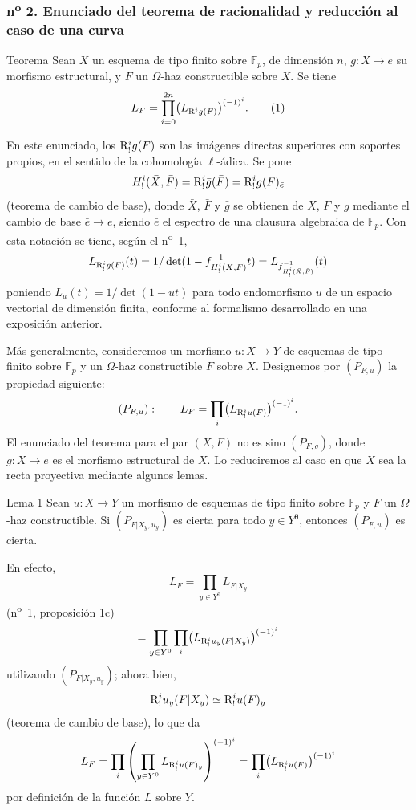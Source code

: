 \subsubsection*{n\textsuperscript{o} 2. Enunciado del teorema de racionalidad y reducción al caso de una curva}

\begin{statement}{Teorema}
Sean $X$ un esquema de tipo finito sobre $\mathbb F_p$, de dimensión $n$, $g:X\to e$ su morfismo estructural, y $F$ un $\Omega$-haz constructible sobre $X$. Se tiene
\[
L_F=\prod_{i=0}^{2n}\bigl(L_{\mathrm{R}^i_!g(F)}\bigr)^{(-1)^i}.
\tag{1}
\]
\end{statement}

En este enunciado, los $\mathrm{R}^i_!g(F)$ son las imágenes directas superiores con soportes propios, en el sentido de la cohomología $\ell$-ádica. Se pone
\[
H^i_!(\bar X,\bar F)=\mathrm{R}^i_!\bar g(\bar F)=\mathrm{R}^i_!g(F)_{\bar e}
\]
(teorema de cambio de base), donde $\bar X$, $\bar F$ y $\bar g$ se obtienen de $X$, $F$ y $g$ mediante el cambio de base $\bar e\to e$, siendo $\bar e$ el espectro de una clausura algebraica de $\mathbb F_p$. Con esta notación se tiene, según el n\textsuperscript{o}~1,
\[
L_{\mathrm{R}^i_!g(F)}(t)=1/\det(1-f^{-1}_{H^i_!(\bar X,\bar F)}t)
 =L_{f^{-1}_{H^i_!(\bar X,\bar F)}}(t)
\]
poniendo $L_u(t)=1/\det(1-ut)$ para todo endomorfismo $u$ de un espacio vectorial de dimensión finita, conforme al formalismo desarrollado en una exposición anterior.

Más generalmente, consideremos un morfismo $u:X\to Y$ de esquemas de tipo finito sobre $\mathbb F_p$ y un $\Omega$-haz constructible $F$ sobre $X$. Designemos por $(P_{F,u})$ la propiedad siguiente:
\[
(P_{F,u}):\qquad
L_F=\prod_i\bigl(L_{\mathrm{R}^i_!u(F)}\bigr)^{(-1)^i}.
\]
El enunciado del teorema para el par $(X,F)$ no es sino $(P_{F,g})$, donde $g:X\to e$ es el morfismo estructural de $X$. Lo reduciremos al caso en que $X$ sea la recta proyectiva mediante algunos lemas.

\begin{statement}{Lema 1}
Sean $u:X\to Y$ un morfismo de esquemas de tipo finito sobre $\mathbb F_p$ y $F$ un $\Omega$-haz constructible. Si $(P_{F|X_y,u_y})$ es cierta para todo $y\in Y^0$, entonces $(P_{F,u})$ es cierta.
\end{statement}

En efecto,
\[
L_F=\prod_{y\in Y^0}L_{F|X_y}
\]
(n\textsuperscript{o}~1, proposición 1c)
\[
=\prod_{y\in Y^0}\prod_i\bigl(L_{\mathrm{R}^i_!u_y(F|X_y)}\bigr)^{(-1)^i}
\]
utilizando $(P_{F|X_y,u_y})$; ahora bien,
\[
\mathrm{R}^i_!u_y(F|X_y)\simeq \mathrm{R}^i_!u(F)_y
\]
(teorema de cambio de base), lo que da
\[
L_F=\prod_i\left(\prod_{y\in Y^0}L_{\mathrm{R}^i_!u(F)_y}\right)^{(-1)^i}
=\prod_i\bigl(L_{\mathrm{R}^i_!u(F)}\bigr)^{(-1)^i}
\]
por definición de la función $L$ sobre $Y$.
